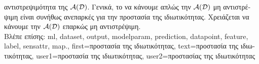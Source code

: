 {{{		αντιστρεψιμότητα της}  $\mathcal{A}(\mathcal{D})$. \foreignlanguage{greek}{Γενικά, το να κάνουμε απλώς την 
		$\mathcal{A}(\mathcal{D})$ μη αντιστρέψιμη είναι συνήθως ανεπαρκές για την προστασία της ιδιωτικότητας. Χρειάζεται να κάνουμε την 
		$\mathcal{A}(\mathcal{D})$ επαρκώς μη αντιστρέψιμη.}
		\\
		\foreignlanguage{greek}{Βλέπε επίσης:} \gls{ml}, \gls{dataset}, \gls{output}, \gls{modelparam}, \gls{prediction}, \gls{datapoint}, \gls{feature}, 
		\gls{label}, \gls{sensattr}, \gls{map}.}, 
	first={\foreignlanguage{greek}{προστασία της ιδιωτικότητας}}, 
	text={\foreignlanguage{greek}{προστασία της ιδιωτικότητας}},
	user1={\foreignlanguage{greek}{προστασία της ιδιωτικότητας}}, %
   	user2={\foreignlanguage{greek}{προστασίας της ιδιωτικότητας}} %
}

